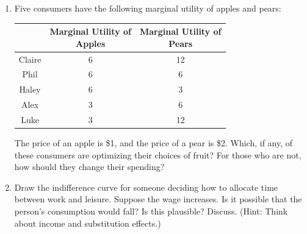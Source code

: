 \documentclass{article}
\begin{document}
\begin{enumerate}
\newpage

\item Five consumers have the following marginal utility of apples and pears:

	\begin{center}
	\begin{tabular}{| c | c | c |}
	\hline
	& \makecell{Marginal Utility of\\Apples} & \makecell{Marginal Utility of\\Pears} \\
	\hline
	Claire & 6 & 12 \\
	\hline
	Phil & 6 & 6 \\
	\hline
	Haley & 6 & 3 \\
	\hline
	Alex & 3 & 6 \\
	\hline
	Luke & 3 & 12 \\
	\hline
	\end{tabular}
	\end{center}
	
	The price of an apple is \$1, and the price of a pear is \$2. Which, if any, of these consumers are optimizing their choices of fruit? For those who are not, how should they change their spending?
	
\item Draw the indifference curve for someone deciding how to allocate time between work and leisure. Suppose the wage increases. Is it possible that the person's consumption would fall? Is this plausible? Discuss. (Hint: Think about income and substitution effects.)
		
\end{enumerate}
\end{document}
